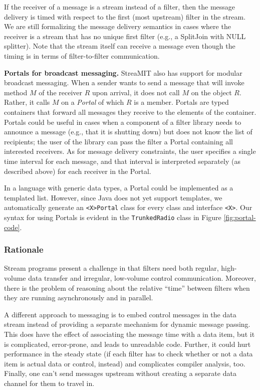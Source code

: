 If the receiver of a message is a stream instead of a filter, then the
message delivery is timed with respect to the first (most upstream)
filter in the stream.  We are still formalizing the message delivery
semantics in cases where the receiver is a stream that has no unique
first filter (e.g., a SplitJoin with NULL splitter).  Note that the
stream itself can receive a message even though the timing is in terms
of filter-to-filter communication.

{\bf Portals for broadcast messaging.}  StreaMIT also has support for
modular broadcast messaging.  When a sender wants to send a message
that will invoke method $M$ of the receiver $R$ upon arrival, it does
not call $M$ on the object $R$.  Rather, it calls $M$ on a {\it
Portal} of which $R$ is a member.  Portals are typed containers that
forward all messages they receive to the elements of the container.
Portals could be useful in cases when a component of a filter library
needs to announce a message (e.g., that it is shutting down) but does
not know the list of recipients; the user of the library can pass the
filter a Portal containing all interested receivers.  As for message
delivery constraints, the user specifies a single time interval for
each message, and that interval is interpreted separately (as
described above) for each receiver in the Portal.

In a language with generic data types, a Portal could be implemented
as a templated list.  However, since Java does not yet support
templates, we automatically generate an {\tt <X>Portal} class for
every class and interface {\tt <X>}.  Our syntax for using Portals is
evident in the {\tt TrunkedRadio} class in Figure
\ref{fig:portal-code}.

\subsubsection{Rationale}

Stream programs present a challenge in that filters need both regular,
high-volume data transfer and irregular, low-volume control
communication.  Moreover, there is the problem of reasoning about the
relative ``time'' between filters when they are running asynchronously
and in parallel.

A different approach to messaging is to embed control messages in the
data stream instead of providing a separate mechanism for dynamic
message passing.  This does have the effect of associating the message
time with a data item, but it is complicated, error-prone, and leads
to unreadable code.  Further, it could hurt performance in the steady
state (if each filter has to check whether or not a data item is
actual data or control, instead) and complicates compiler analysis,
too.  Finally, one can't send messages upstream without creating a
separate data channel for them to travel in.

